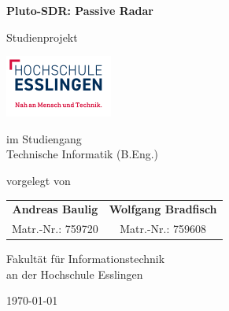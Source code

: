 \begin{titlepage}
    \begin{center}
        \vspace*{1cm}
        {\Huge \textbf{Pluto-SDR: Passive Radar}}

        \vspace{0.5cm}

        {\Large Studienprojekt}

        \vspace{1cm}

        \includegraphics{images/logo_claim_de.png}

        \vspace{1cm}

        \large
        im Studiengang \\
        \Large
        Technische Informatik (B.Eng.)

        \vspace{1cm}

        \large
        vorgelegt von

        \vspace{0.25cm}

        \Large
        \begin{tabular}{c c}
            \textbf{Andreas Baulig} & \textbf{Wolfgang Bradfisch} \\
            Matr.-Nr.: 759720       & Matr.-Nr.: 759608           \\
        \end{tabular}

        \vspace{0.5cm}

        Fakultät für Informationstechnik \\
        an der Hochschule Esslingen

        \vfill

        \today

    \end{center}
\end{titlepage}
